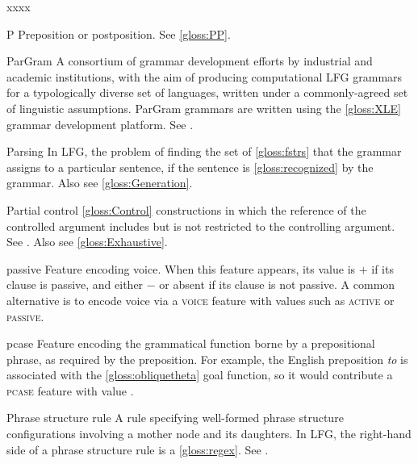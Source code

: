 \documentclass[output=paper,colorlinks,citecolor=brown]{langscibook}
\begin{document}
\begin{labeling}{xxxx}
\item[P] Preposition or postposition. See \ref{gloss:PP}.

\item[ParGram\namedlabel{gloss:PARGRAM}{ParGram}] A consortium of grammar development efforts by industrial and academic institutions, with the aim of producing computational LFG grammars for a typologically diverse set of languages, written under a commonly-agreed set of linguistic assumptions.  ParGram grammars are written using the \ref{gloss:XLE} grammar development platform.  See \citetv[\ref{sec:pargram}]{chapters/ImplementationsApplications}.

\item[Parsing\namedlabel{gloss:parsing}{parsing}\namedlabel{gloss:Parsing}{Parsing}] In LFG, the problem of finding the set of \ref{gloss:fstrs} that the grammar assigns to a particular sentence, if the sentence is \ref{gloss:recognized} by the grammar.  Also see \ref{gloss:Generation}.

\item[Partial control\namedlabel{gloss:partial}{partial}\namedlabel{gloss:Partial}{Partial control}] \ref{gloss:Control} constructions in which the reference of the controlled argument includes but is not restricted to the controlling argument. See .  Also see \ref{gloss:Exhaustive}.
  
\item[passive] Feature encoding voice. When this feature appears, its value is $+$ if its clause is passive, and either $-$ or absent if its clause is not passive.  A common alternative is to encode voice via a \textsc{voice} feature with values such as \textsc{active} or \textsc{passive}.

\item[pcase] Feature encoding the grammatical function borne by a prepositional phrase, as required by the preposition.  For example, the English preposition \emph{to} is associated with the \ref{gloss:obliquetheta} goal function, so it would contribute a \textsc{pcase} feature with value .

\item[Phrase structure rule\namedlabel{gloss:psr}{phrase structure rule}\namedlabel{gloss:psrs}{phrase structure rules}] A rule specifying well-formed phrase structure configurations involving a mother node and its daughters.  In LFG, the right-hand side of a phrase structure rule is a \ref{gloss:regex}.  See \citetv[\ref{sect:intro:c-structure}]{chapters/Intro}.


\end{labeling}
\end{document}
